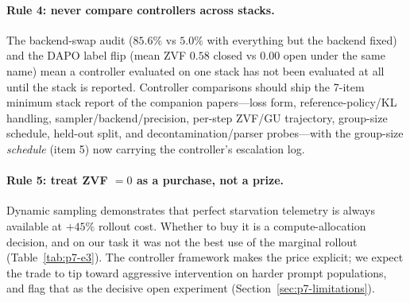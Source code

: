 \paragraph{Rule 4: never compare controllers across stacks.} The
backend-swap audit ($85.6\%$ vs $5.0\%$ with everything but the backend
fixed) and the DAPO label flip (mean ZVF $0.58$ closed vs $0.00$ open under
the same name) mean a controller evaluated on one stack has not been
evaluated at all until the stack is reported. Controller comparisons should
ship the 7-item minimum stack report of the companion papers---loss form,
reference-policy/KL handling, sampler/backend/precision, per-step ZVF/GU
trajectory, group-size schedule, held-out split, and
decontamination/parser probes---with the group-size \emph{schedule} (item
5) now carrying the controller's escalation log.

\paragraph{Rule 5: treat ZVF $= 0$ as a purchase, not a prize.} Dynamic
sampling demonstrates that perfect starvation telemetry is always available
at $+45\%$ rollout cost. Whether to buy it is a compute-allocation
decision, and on our task it was not the best use of the marginal rollout
(Table~\ref{tab:p7-e3}). The controller framework makes the price explicit;
we expect the trade to tip toward aggressive intervention on harder prompt
populations, and flag that as the decisive open experiment
(Section~\ref{sec:p7-limitations}).
